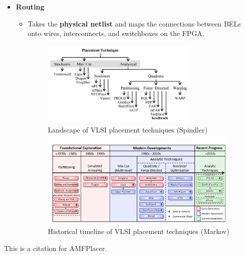 \documentclass{article}
\begin{document}
\begin{itemize}[label={\textbullet}, left=0.25cm]
    \item \textbf{Routing}
    \begin{itemize}[label={--}, left=0.25cm]
        \item Takes the \textbf{physical netlist} and maps the connections between BELs onto wires, interconnects, and switchboxes on the FPGA.
        \begin{figure}
            \begin{center}
                \includegraphics[width=0.75\textwidth]{figures/kraftwerk2.png}
            \end{center}
            \caption{Landscape of VLSI placement techniques (Spindler) \cite{kraftwerk2} }
            \label{fig:}
        \end{figure}
        \begin{figure}
            \begin{center}
                \includegraphics[width=0.95\textwidth]{figures/ProCha.png}
            \end{center}
            \caption{Historical timeline of VLSI placement techniques (Markov) \cite{ProCha} }
            \label{fig:}
        \end{figure}
    \end{itemize}

\end{itemize}

This is a citation for AMFPlacer. \cite{AMFPlacer}

\newpage

\nocite{*}

\end{document}
